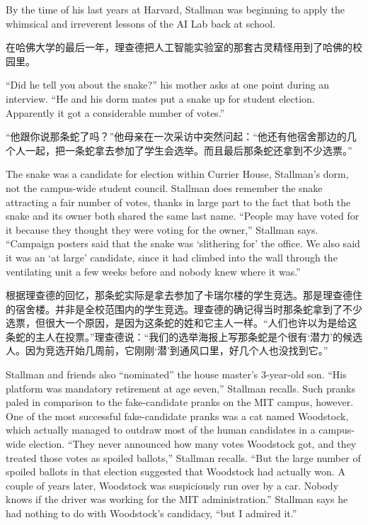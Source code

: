 \ifdefined\eng
By the time of his last years at Harvard, Stallman was beginning to apply the whimsical and irreverent lessons of the AI Lab back at school.
\fi

\ifdefined\chs
在哈佛大学的最后一年，理查德把人工智能实验室的那套古灵精怪用到了哈佛的校园里。
\fi

\ifdefined\eng
``Did he tell you about the snake?'' his mother asks at one point during an interview. ``He and his dorm mates put a snake up for student election. Apparently it got a considerable number of votes.''
\fi

\ifdefined\chs
“他跟你说那条蛇了吗？”他母亲在一次采访中突然问起：“他还有他宿舍那边的几个人一起，把一条蛇拿去参加了学生会选举。而且最后那条蛇还拿到不少选票。”
\fi

\ifdefined\eng
The snake was a candidate for election within Currier House, Stallman's dorm, not the campus-wide student council. Stallman does remember the snake attracting a fair number of votes, thanks in large part to the fact that both the snake and its owner both shared the same last name. ``People may have voted for it because they thought they were voting for the owner,'' Stallman says. ``Campaign posters said that the snake was `slithering for' the office. We also said it was an `at large' candidate, since it had climbed into the wall through the ventilating unit a few weeks before and nobody knew where it was.''
\fi

\ifdefined\chs
根据理查德的回忆，那条蛇实际是拿去参加了卡瑞尔楼的学生竞选。那是理查德住的宿舍楼。并非是全校范围内的学生竞选。理查德的确记得当时那条蛇拿到了不少选票，但很大一个原因，是因为这条蛇的姓和它主人一样。“人们也许以为是给这条蛇的主人在投票。”理查德说：“我们的选举海报上写那条蛇是个很有‘潜力’的候选人。因为竞选开始几周前，它刚刚‘潜’到通风口里，好几个人也没找到它。”
\fi

\ifdefined\eng
Stallman and friends also ``nominated'' the house master's 3-year-old son. ``His platform was mandatory retirement at age seven,'' Stallman recalls. Such pranks paled in comparison to the fake-candidate pranks on the MIT campus, however. One of the most successful fake-candidate pranks was a cat named Woodstock, which actually managed to outdraw most of the human candidates in a campus-wide election. ``They never announced how many votes Woodstock got, and they treated those votes as spoiled ballots,'' Stallman recalls. ``But the large number of spoiled ballots in that election suggested that Woodstock had actually won. A couple of years later, Woodstock was suspiciously run over by a car. Nobody knows if the driver was working for the MIT administration.'' Stallman says he had nothing to do with Woodstock's candidacy, ``but I admired it.''
\fi

